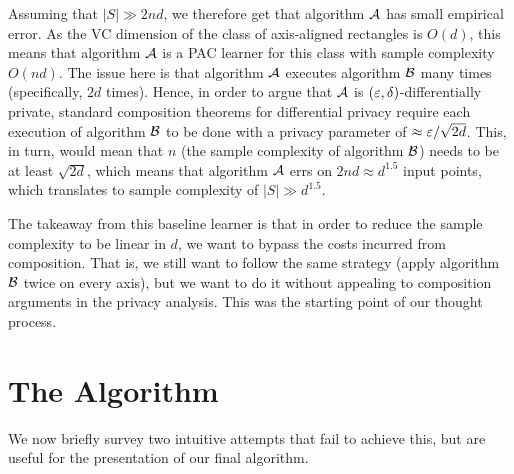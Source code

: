 \documentclass[12pt,a4paper,oneside,onecolumn]{book}
\begin{document}
Assuming that $|S|\gg 2nd$, we therefore get that algorithm $\mathcal{A}$ has small empirical error. As the VC dimension of the class of axis-aligned rectangles is $O(d)$, this means that algorithm $\mathcal{A}$ is a PAC learner for this class with sample complexity $O(nd)$. The issue here is that algorithm $\mathcal{A}$ executes algorithm $\mathcal{B}$ many times (specifically, $2d$ times). Hence, in order to argue that $\mathcal{A}$ is $(\varepsilon,\delta)$-differentially private, standard composition theorems for differential privacy require each execution of algorithm $\mathcal{B}$ to be done with a privacy parameter of $\approx\varepsilon/\sqrt{2d}$. This, in turn, would mean that $n$ (the sample complexity of algorithm $\mathcal{B}$) needs to be at least $\sqrt{2d}$, which means that algorithm $\mathcal{A}$ errs on $2nd\approx d^{1.5}$ input points, which translates to sample complexity of $|S|\gg d^{1.5}$.

The takeaway from this baseline learner is that in order to reduce the sample complexity to be linear in $d$, we want to bypass the costs incurred from composition. That is, we still want to follow the same strategy (apply algorithm $\mathcal{B}$ twice on every axis), but we want to do it without appealing to composition arguments in the privacy analysis. This was the starting point of our thought process.

\section{The Algorithm}
\label{sec:algorithm}

We now briefly survey two intuitive attempts that fail to achieve this, but are useful for the presentation of our final algorithm.
\end{document}
